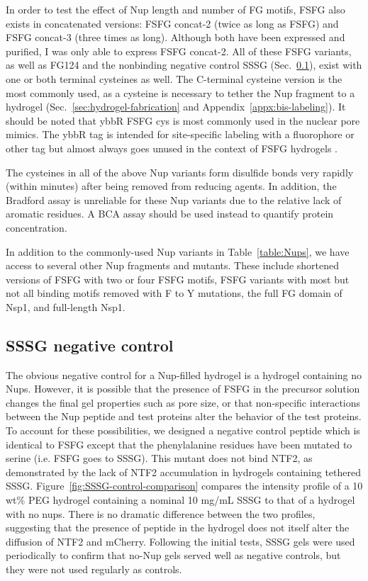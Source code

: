In order to test the effect of Nup length and number of FG motifs, FSFG also exists in concatenated versions: FSFG concat-2 (twice as long as FSFG) and FSFG concat-3 (three times as long).  Although both have been expressed and purified, I was only able to express FSFG concat-2.  All of these FSFG variants, as well as FG124 and the nonbinding negative control SSSG (Sec.~\ref{sec:SSSG}), exist with one or both terminal cysteines as well.  The C-terminal cysteine version is the most commonly used, as a cysteine is necessary to tether the Nup fragment to a hydrogel (Sec.~\ref{sec:hydrogel-fabrication} and Appendix~\ref{appx:bis-labeling}).  It should be noted that ybbR FSFG cys is most commonly used in the nuclear pore mimics.  The ybbR tag is intended for site-specific labeling with a fluorophore or other tag but almost always goes unused in the context of FSFG hydrogels \cite{yin05}.

The cysteines in all of the above Nup variants form disulfide bonds very rapidly (within minutes) after being removed from reducing agents.  In addition, the Bradford assay is unreliable for these Nup variants due to the relative lack of aromatic residues.  A BCA assay should be used instead to quantify protein concentration.

In addition to the commonly-used Nup variants in Table~\ref{table:Nups}, we have access to several other Nup fragments and mutants.  These include shortened versions of FSFG with two or four FSFG motifs, FSFG variants with most but not all binding motifs removed with F to Y mutations, the full FG domain of Nsp1, and full-length Nsp1.

\subsection{SSSG negative control}
\label{sec:SSSG}

The obvious negative control for a Nup-filled hydrogel is a hydrogel containing no Nups. However, it is possible that the presence of FSFG in the precursor solution changes the final gel properties such as pore size, or that non-specific interactions between the Nup peptide and test proteins alter the behavior of the test proteins.  To account for these possibilities, we designed a negative control peptide which is identical to FSFG except that the phenylalanine residues have been mutated to serine (i.e. FSFG goes to SSSG).  This mutant does not bind NTF2, as demonstrated by the lack of NTF2 accumulation in hydrogels containing tethered SSSG. Figure~\ref{fig:SSSG-control-comparison} compares the intensity profile of a 10 wt\% PEG hydrogel containing a nominal 10 mg/mL SSSG to that of a hydrogel with no nups.  There is no dramatic difference between the two profiles, suggesting that the presence of peptide in the hydrogel does not itself alter the diffusion of NTF2 and mCherry.  Following the initial tests, SSSG gels were used periodically to confirm that no-Nup gels served well as negative controls, but they were not used regularly as controls.

